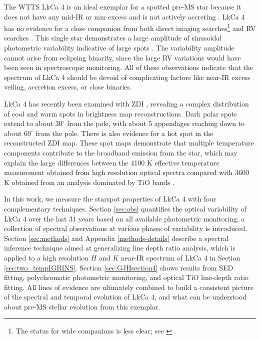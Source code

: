 \documentclass[twocolumn]{emulateapj}%
\newcommand{\name}{LkCa 4 }
\begin{document}
The WTTS LkCa 4 \citep{herbig86,strom89a,downes88,strom89b} is an ideal exemplar for a spotted pre-MS star because it does not have any mid-IR or mm excess \citep[\emph{e.g.}][]{andrews05,furlan06,buckle15} and is not actively accreting \citep[\emph{e.g.}][]{edwards06,cauley12}.  LkCa 4 has no evidence for a close companion from both direct imaging searches\citep{karr10,kraus11,daemgen15}\footnote{The status for wide companions is less clear; see \citet{stauffer91,itoh08,kraus09,kraus11,herczeg14}} and RV searches \citep{nguyen12,donati14}.  This single star demonstrates a large amplitude of sinusoidal photometric variability indicative of large spots \citep{grankin08,xiao12}.  The variability amplitude cannot arise from eclipsing binarity, since the large RV variations would have been seen in spectroscopic monitoring.  All of these observations indicate that the spectrum of \name should be devoid of complicating factors like near-IR excess veiling, accretion excess, or close binaries.    

LkCa 4 has recently been examined with ZDI \citep{donati14}, revealing a complex distribution of cool and warm spots in brightness map reconstructions.  Dark polar spots extend to about $30^\circ$ from the pole, with about 5 appendages reaching down to about $60^\circ$ from the pole.  There is also evidence for a hot spot in the reconstructed ZDI map.  These spot maps demonstrate that multiple temperature components contribute to the broadband emission from the star, which may explain the large differences between the 4100 K effective temperature measurement obtained from high resolution optical spectra \citep{donati14} compared with 3600 K obtained from an analysis dominated by TiO bands \citep{herczeg14}.

In this work, we measure the starspot properties of LkCa 4 with four complementary techniques.  Section \ref{sec:obs} quantifies the optical variability of LkCa 4 over the last 31 years based on all available photometric monitoring; a collection of spectral observations at various phases of variability is introduced.  Section \ref{sec:methods} and Appendix \ref{methods-details} describe a spectral inference technique aimed at generalizing line depth ratio analysis, which is applied to a high resolution $H$ and $K$ near-IR spectrum of LkCa 4 in Section \ref{sec:two_tempIGRINS}.  Section \ref{sec:GJHsection4} shows results from SED fitting, polychromatic photometric monitoring, and optical TiO line-depth ratio fitting.  All lines of evidence are ultimately combined to build a consistent picture of the spectral and temporal evolution of LkCa 4, and what can be understood about pre-MS stellar evolution from this exemplar.
\end{document}
